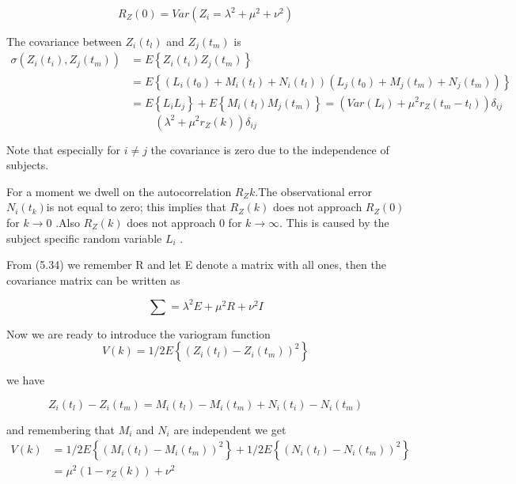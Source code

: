 \[ R_{Z}(0)=Var(Z_{i}=\lambda^{2}+\mu^{2}+\nu^{2}) \]

The covariance between $ Z_{i}(t_{l}) $ and $ Z_{j}(t_{m}) $ is
\begin{equation*}
\begin{aligned}
\sigma (Z_{i}(t_{i}), Z_{j}(t_{m}))&=E\left\lbrace Z_{i}(t_{i}) Z_{j}(t_{m})\right\rbrace\\
&=E\left\lbrace(L_{i}(t_{0})+M_{i}(t_{l})+N_{i}(t_{l}))(L_{j}(t_{0})+M_{j}(t_{m})+N_{j}(t_{m}))  \right\rbrace\\
&= E\left\lbrace L_{i}L_{j}\right\rbrace +E\left\lbrace M_{i}(t_{l})M_{j}(t_{m}) \right\rbrace =(Var(L_{i})+\mu^{2}r_{Z}(t_{m}-t_{l}))\delta_{ij}
\end{aligned}
\end{equation*}
\[ (\lambda^{2}+\mu^{2}r_{Z}(k))\delta_{ij} \]

Note that especially for $ i\neq j $ the covariance is zero due to the independence of subjects. 

For a moment we dwell on the autocorrelation $ R_{Z}{k} $.The observational error $ N_{i}(t_{k}) $is not equal to zero; this implies that $ R_{Z}(k) $ does not approach $ R_{Z}(0) $ for $ k\rightarrow 0 $ .Also $ R_{Z}(k) $ does not approach 0 for $ k\rightarrow \infty $. This is caused by the subject specific random variable $ L_{i} $ .

 From (5.34) we remember R and let E denote a matrix with all ones, then the covariance matrix can be written as  
 
 \[ \sum = \lambda^{2}E+\mu^{2}R+\nu^{2}I \]
 
 Now we are ready to introduce the variogram function 
 \begin{equation}\label{5.37}
 V(k) = 1/2E\left\lbrace (Z_{i}(t_{l})-Z_{i}(t_{m}))^{2} \right\rbrace
 \end{equation}
  
 
 we have 
 
 \[ Z_{i}(t_{l})-Z_{i}(t_{m})=M_{i}(t_{l})-M_{i}(t_{m})+N_{i}(t_{i})-N_{i}(t_{m})\]
 
 and remembering that $ M_{i} $ and $ N_{i} $ are independent we get
 \begin{equation*}
 \begin{aligned}
 V(k)&=1/2E\left\lbrace (M_{i}(t_{l})-M_{i}(t_{m}))^{2}\right\rbrace+1/2E\left\lbrace (N_{i}(t_{l})-N_{i}(t_{m}))^{2}\right\rbrace\\
 &=\mu^{2}(1-r_{Z}(k))+\nu^{2} 
 \end{aligned}
 \end{equation*}
  
